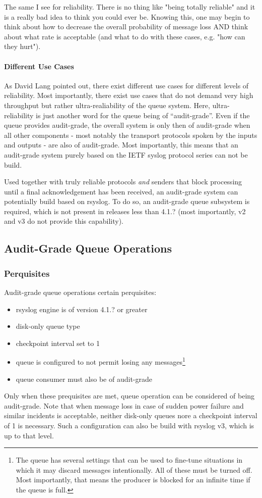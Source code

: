 \documentclass[a4paper,10pt]{article}
\begin{document}
The same I see for reliability. There is no thing like "being totally reliable" and it is a really bad idea to think you could ever be. Knowing this, one may begin to think about how to decrease the overall probability of message loss AND think about what rate is acceptable (and what to do with these cases, e.g. "how can they hurt").

\paragraph{Different Use Cases}
As David Lang pointed out, there exist different use cases for different levels of reliability. Most importantly, there exist use cases that do not demand very high throughput but rather ultra-realiability of the queue system. Here, ultra-reliability is just another word for the queue being of ``audit-grade''. Even if the queue provides audit-grade, the overall system is only then of audit-grade when all other components - most notably the transport protocols spoken by the inputs and outputs - are also of audit-grade. Most importantly, this means that an audit-grade system purely based on the IETF syslog protocol series can not be build.

Used together with truly reliable protocols \emph{and} senders that block processing until a final acknowledgement has been received, an audit-grade system can potentially build based on rsyslog. To do so, an audit-grade queue subsystem is required, which is not present in releases less than 4.1.? (most importantly, v2 and v3 do not provide this capability).

\subsection{Audit-Grade Queue Operations}
\subsubsection{Perquisites}
Audit-grade queue operations certain perquisites:
\begin{itemize}
\item rsyslog engine is of version 4.1.? or greater
\item disk-only queue type
\item checkpoint interval set to 1
\item queue is configured to not permit losing any messages\footnote{The queue has several settings that can be used to fine-tune situations in which it may discard messages intentionally. All of these must be turned off. Most importantly, that means the producer is blocked for an infinite time if the queue is full.}
\item queue consumer must also be of audit-grade
\end{itemize}
Only when these prequisites are met, queue operation can be considered of being audit-grade. Note that when message loss in case of sudden power failure and similar incidents is acceptable, neither disk-only queues nore a checkpoint interval of 1 is necessary. Such a configuration can also be build with rsyslog v3, which is up to that level.
\end{document}
